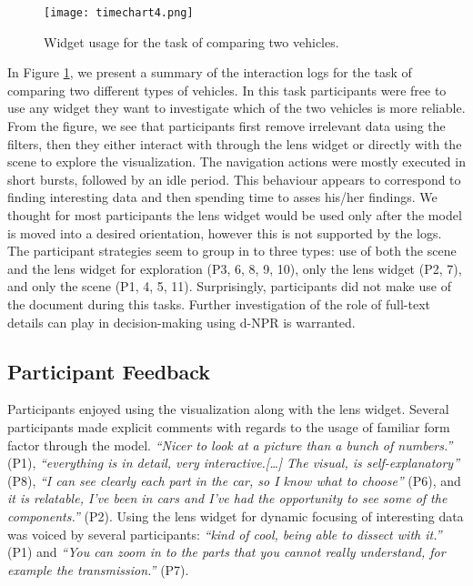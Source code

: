 	\begin{figure}
	 \centering  
	 \texttt{[image: timechart4.png]}  
	 \caption{Widget usage for the task of comparing two vehicles.}
	 \label{figure:timechart}
	\end{figure}

In Figure \ref{figure:timechart}, we present a summary of the interaction logs
for the task of comparing two different types of vehicles. In this task
participants were free to use any widget they want to investigate which of the
two vehicles is more reliable. From the figure, we see that participants first
remove irrelevant data using the filters, then they either interact with through
the lens widget or directly with the \threed scene to explore the visualization.
The navigation actions were mostly executed in short bursts, followed by an idle
period. This behaviour appears to correspond to finding interesting data and
then spending time to asses his/her findings. We thought for most participants
the lens widget would be used only after the \threed model is moved into a
desired orientation, however this is not supported by the logs. The participant
strategies seem to group in to three types: use of both the \threed scene and
the lens widget for exploration (P3, 6, 8, 9, 10), only the lens widget (P2, 7),
and only the \threed scene (P1, 4, 5, 11). Surprisingly, participants did not
make use of the document during this tasks. Further investigation of the role of
full-text details can play in decision-making using d-NPR is warranted.


 
\subsection{Participant Feedback}
Participants enjoyed using the \threed visualization along with the lens widget.
Several participants made explicit comments with regards to the usage of
familiar form factor through the \threed model. \emph{``Nicer to look at a
picture than a bunch of numbers.''} (P1), \emph{``everything is in detail, very
interactive.[\ldots] The visual, is self-explanatory''} (P8), \emph{``I can see
clearly each part in the car, so I know what to choose''} (P6), and \emph{it is
relatable, I've been in cars and I've had the opportunity to see some of the
components.''} (P2). Using the lens widget for dynamic focusing of interesting
data was voiced by several participants: \emph{``kind of cool, being able to
dissect with it.''} (P1) and \emph{``You can zoom in to the parts that you
cannot really understand, for example the transmission.''} (P7).

